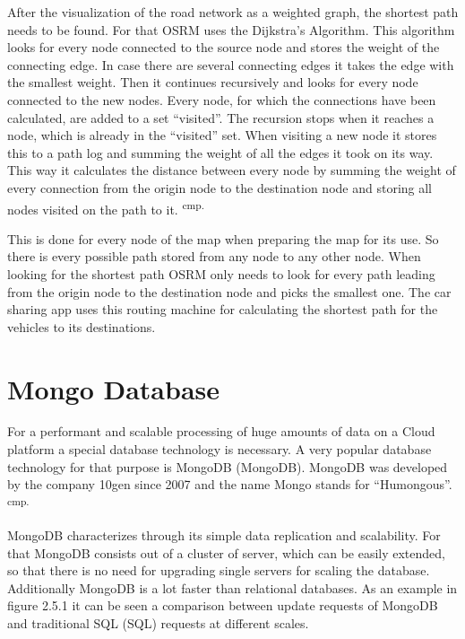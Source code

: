 After the visualization of the road network as a weighted graph, the shortest path needs to be found. For that OSRM uses the Dijkstra's Algorithm. This algorithm looks for every node connected to the source node and stores the weight of the connecting edge. In case there are several connecting edges it takes the edge with the smallest weight. Then it continues recursively and looks for every node connected to the new nodes. Every node, for which the connections have been calculated, are added to a set ``visited''. The recursion stops when it reaches a node, which is already in the ``visited'' set. When visiting a new node it stores this to a path log and summing the weight of all the edges it took on its way. This way it calculates the distance between every node by summing the weight of every connection from the origin node to the destination node and storing all nodes visited on the path to it.  \textsuperscript{cmp.\cite{32}}


This is done for every node of the map when preparing the map for its use. So there is every possible path stored from any node to any other node. When looking for the shortest path OSRM only needs to look for every path leading from the origin node to the destination node and picks the smallest one. The car sharing app uses this routing machine for calculating the shortest path for the vehicles to its destinations.

\section{Mongo Database}

For a performant and scalable processing of huge amounts of data on a Cloud platform a special database technology is necessary. A very popular database technology for that purpose is \acs{MongoDB} (\acl{MongoDB}). MongoDB was developed by the company 10gen since 2007 and the name Mongo stands for ``Humongous''.  \textsuperscript{cmp.\cite{33}}


MongoDB characterizes through its simple data replication and scalability. For that MongoDB consists out of a cluster of server, which can be easily extended, so that there is no need for upgrading single servers for scaling the database. Additionally MongoDB is a lot faster than relational databases. As an example in figure 2.5.1 it can be seen a comparison between update requests of MongoDB and traditional \acs{SQL} (\acl{SQL}) requests at different scales.

